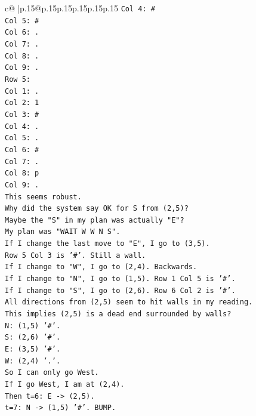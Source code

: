 \documentclass{article}
\begin{document}
{\begin{supertabular}{c@{$\;$}|p{.15\linewidth}@{}p{.15\linewidth}p{.15\linewidth}p{.15\linewidth}p{.15\linewidth}p{.15\linewidth}}
{{{\texttt{Col 4: \#} \\
\texttt{Col 5: \#} \\
\texttt{Col 6: .} \\
\texttt{Col 7: .} \\
\texttt{Col 8: .} \\
\texttt{Col 9: .} \\
\texttt{Row 5:} \\
\texttt{Col 1: .} \\
\texttt{Col 2: 1} \\
\texttt{Col 3: \#} \\
\texttt{Col 4: .} \\
\texttt{Col 5: .} \\
\texttt{Col 6: \#} \\
\texttt{Col 7: .} \\
\texttt{Col 8: p} \\
\texttt{Col 9: .} \\
\texttt{This seems robust.} \\
\texttt{Why did the system say OK for S from (2,5)?} \\
\texttt{Maybe the "S" in my plan was actually "E"?} \\
\texttt{My plan was "WAIT W W N S".} \\
\texttt{If I change the last move to "E", I go to (3,5).} \\
\texttt{Row 5 Col 3 is '\#'. Still a wall.} \\
\texttt{If I change to "W", I go to (2,4). Backwards.} \\
\texttt{If I change to "N", I go to (1,5). Row 1 Col 5 is '\#'.} \\
\texttt{If I change to "S", I go to (2,6). Row 6 Col 2 is '\#'.} \\
\texttt{All directions from (2,5) seem to hit walls in my reading.} \\
\texttt{This implies (2,5) is a dead end surrounded by walls?} \\
\texttt{N: (1,5) '\#'.} \\
\texttt{S: (2,6) '\#'.} \\
\texttt{E: (3,5) '\#'.} \\
\texttt{W: (2,4) '.'.} \\
\texttt{So I can only go West.} \\
\texttt{If I go West, I am at (2,4).} \\
\texttt{Then t=6: E {-}> (2,5).} \\
\texttt{t=7: N {-}> (1,5) '\#'. BUMP.} \\
}}}
\end{supertabular}}
\end{document}

